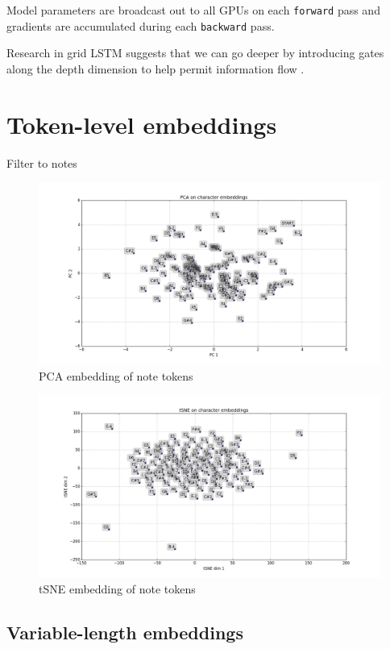 Model parameters are broadcast out to all GPUs on each \texttt{forward} pass
and gradients are accumulated during each \texttt{backward} pass.

Research in grid LSTM suggests that we can go deeper by introducing
gates along the depth dimension to help permit information flow .

\section{Token-level embeddings}


Filter to notes

\begin{figure}[htpb]
    \centering
    \includegraphics[width=1.0\linewidth]{PCA-notes.png}
    \caption{PCA embedding of note tokens}
    \label{fig:pca-notes}
\end{figure}

\begin{figure}[htpb]
    \centering
    \includegraphics[width=1.0\linewidth]{tSNE-notes.png}
    \caption{tSNE embedding of note tokens}
    \label{fig:tsne-notes}
\end{figure}

\subsection{Variable-length embeddings}

